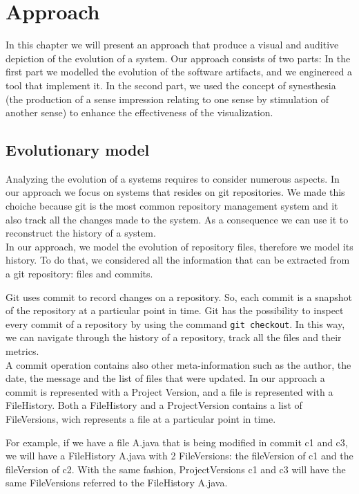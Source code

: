 
\chapter[Approach]{Approach}
\graphicspath{ {images/approach} }

In this chapter we will present an approach that produce a visual and auditive depiction of the evolution of a system. 
Our approach consists of two parts: 
In the first part we modelled the evolution of the software artifacts, and we enginereed a tool that implement it.
In the second part, we used the concept of synesthesia (the production of a sense impression relating to one sense by stimulation of another sense) 
to enhance the effectiveness of the visualization. 

\section{Evolutionary model}
Analyzing the evolution of a systems requires to consider numerous aspects. 
In our approach we focus on systems that resides on git repositories. 
We made this choiche because git is the most common repository management system and it also track all the changes made to the system.
As a consequence we can use it to reconstruct the history of a system.\\

In our approach, we model the evolution of repository files, therefore we model its history. 
To do that, we considered all the information that can be extracted from a git repository: files and commits.

Git uses commit to record changes on a repository. So, each commit is a snapshot of the repository at a particular point in time.
Git has the possibility to inspect every commit of a repository by using the command \texttt{git checkout}. 
In this way, we can navigate through the history of a repository, track all the files and their metrics.\\

A commit operation contains also other meta-information such as the author, the date, the message and the list of files that were updated. 
In our approach a commit is represented with a Project Version, and a file is represented with a FileHistory. 
Both a FileHistory and a ProjectVersion contains a list of FileVersions, wich represents a file at a particular point in time.

For example, if we have a file A.java that is being modified in commit c1 and c3, we will have a FileHistory A.java with 
2 FileVersions: the fileVersion of c1 and the fileVersion of c2. 
With the same fashion, ProjectVersions c1 and c3 will have the same FileVersions referred to the FileHistory A.java.

